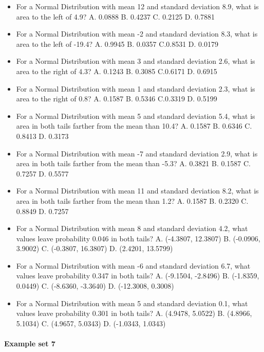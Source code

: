 \documentclass[]{article}
\providecommand{\tightlist}{%
  \setlength{\itemsep}{0pt}\setlength{\parskip}{0pt}}
\let\oldparagraph\paragraph
\renewcommand{\paragraph}[1]{\oldparagraph{#1}\mbox{}}
\begin{document}
\begin{itemize}
\tightlist
\item
  For a Normal Distribution with mean 12 and standard deviation 8.9,
  what is area to the left of 4.9? A. 0.0888 B. 0.4237 C. 0.2125 D.
  0.7881
\item
  For a Normal Distribution with mean -2 and standard deviation 8.3,
  what is area to the left of -19.4? A. 0.9945 B. 0.0357 C.0.8531 D.
  0.0179
\item
  For a Normal Distribution with mean 3 and standard deviation 2.6, what
  is area to the right of 4.3? A. 0.1243 B. 0.3085 C.0.6171 D. 0.6915
\item
  For a Normal Distribution with mean 1 and standard deviation 2.3, what
  is area to the right of 0.8? A. 0.1587 B. 0.5346 C.0.3319 D. 0.5199
\item
  For a Normal Distribution with mean 5 and standard deviation 5.4, what
  is area in both tails farther from the mean than 10.4? A. 0.1587 B.
  0.6346 C. 0.8413 D. 0.3173
\item
  For a Normal Distribution with mean -7 and standard deviation 2.9,
  what is area in both tails farther from the mean than -5.3? A. 0.3821
  B. 0.1587 C. 0.7257 D. 0.5577
\item
  For a Normal Distribution with mean 11 and standard deviation 8.2,
  what is area in both tails farther from the mean than 1.2? A. 0.1587
  B. 0.2320 C. 0.8849 D. 0.7257
\item
  For a Normal Distribution with mean 8 and standard deviation 4.2, what
  values leave probability 0.046 in both tails? A. (-4.3807, 12.3807) B.
  (-0.0906, 3.9002) C. (-0.3807, 16.3807) D. (2.4201, 13.5799)
\item
  For a Normal Distribution with mean -6 and standard deviation 6.7,
  what values leave probability 0.347 in both tails? A. (-9.1504,
  -2.8496) B. (-1.8359, 0.0449) C. (-8.6360, -3.3640) D. (-12.3008,
  0.3008)
\item
  For a Normal Distribution with mean 5 and standard deviation 0.1, what
  values leave probability 0.301 in both tails? A. (4.9478, 5.0522) B.
  (4.8966, 5.1034) C. (4.9657, 5.0343) D. (-1.0343, 1.0343)
\end{itemize}

\paragraph{Example set 7}\label{example-set-7}
\end{document}
